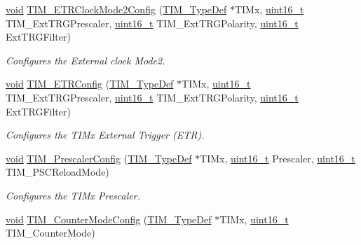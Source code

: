 \begin{DoxyCompactItemize}
\hyperlink{usb__devapi_8h_afabf60e7f57651d6d595a02c75f07cd0}{void} \hyperlink{group___t_i_m___exported___functions_ga0a9cbcbab32326cbbdaf4c111f59ec20}{T\+I\+M\+\_\+\+E\+T\+R\+Clock\+Mode2\+Config} (\hyperlink{struct_t_i_m___type_def}{T\+I\+M\+\_\+\+Type\+Def} $\ast$T\+I\+Mx, \hyperlink{_p_e___types_8h_a1f1825b69244eb3ad2c7165ddc99c956}{uint16\+\_\+t} T\+I\+M\+\_\+\+Ext\+T\+R\+G\+Prescaler, \hyperlink{_p_e___types_8h_a1f1825b69244eb3ad2c7165ddc99c956}{uint16\+\_\+t} T\+I\+M\+\_\+\+Ext\+T\+R\+G\+Polarity, \hyperlink{_p_e___types_8h_a1f1825b69244eb3ad2c7165ddc99c956}{uint16\+\_\+t} Ext\+T\+R\+G\+Filter)
\begin{DoxyCompactList}\small\item\em Configures the External clock Mode2. \end{DoxyCompactList}\item 
\hyperlink{usb__devapi_8h_afabf60e7f57651d6d595a02c75f07cd0}{void} \hyperlink{group___t_i_m___exported___functions_ga8bdde400b7a30f3e747fe8e4962c0abe}{T\+I\+M\+\_\+\+E\+T\+R\+Config} (\hyperlink{struct_t_i_m___type_def}{T\+I\+M\+\_\+\+Type\+Def} $\ast$T\+I\+Mx, \hyperlink{_p_e___types_8h_a1f1825b69244eb3ad2c7165ddc99c956}{uint16\+\_\+t} T\+I\+M\+\_\+\+Ext\+T\+R\+G\+Prescaler, \hyperlink{_p_e___types_8h_a1f1825b69244eb3ad2c7165ddc99c956}{uint16\+\_\+t} T\+I\+M\+\_\+\+Ext\+T\+R\+G\+Polarity, \hyperlink{_p_e___types_8h_a1f1825b69244eb3ad2c7165ddc99c956}{uint16\+\_\+t} Ext\+T\+R\+G\+Filter)
\begin{DoxyCompactList}\small\item\em Configures the T\+I\+Mx External Trigger (E\+TR). \end{DoxyCompactList}\item 
\hyperlink{usb__devapi_8h_afabf60e7f57651d6d595a02c75f07cd0}{void} \hyperlink{group___t_i_m___exported___functions_ga45c6fd9041baf7f64c121e0172f305c7}{T\+I\+M\+\_\+\+Prescaler\+Config} (\hyperlink{struct_t_i_m___type_def}{T\+I\+M\+\_\+\+Type\+Def} $\ast$T\+I\+Mx, \hyperlink{_p_e___types_8h_a1f1825b69244eb3ad2c7165ddc99c956}{uint16\+\_\+t} Prescaler, \hyperlink{_p_e___types_8h_a1f1825b69244eb3ad2c7165ddc99c956}{uint16\+\_\+t} T\+I\+M\+\_\+\+P\+S\+C\+Reload\+Mode)
\begin{DoxyCompactList}\small\item\em Configures the T\+I\+Mx Prescaler. \end{DoxyCompactList}\item 
\hyperlink{usb__devapi_8h_afabf60e7f57651d6d595a02c75f07cd0}{void} \hyperlink{group___t_i_m___exported___functions_ga93941c1db20bf3794f377307df90a67b}{T\+I\+M\+\_\+\+Counter\+Mode\+Config} (\hyperlink{struct_t_i_m___type_def}{T\+I\+M\+\_\+\+Type\+Def} $\ast$T\+I\+Mx, \hyperlink{_p_e___types_8h_a1f1825b69244eb3ad2c7165ddc99c956}{uint16\+\_\+t} T\+I\+M\+\_\+\+Counter\+Mode)

\end{DoxyCompactItemize}
